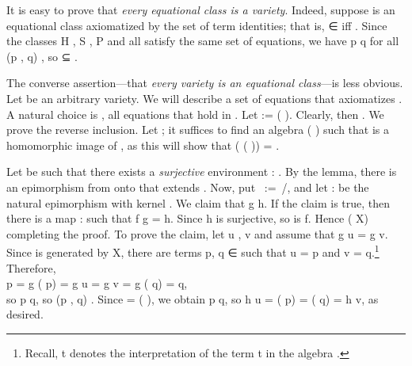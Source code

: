 It is easy to prove that \emph{every equational class is a variety}.  Indeed, suppose  is an equational
class axiomatized by the set  of term identities; that is,  ∈  iff
  . Since the classes \af H , \af S , \af P  and
 all satisfy the same set of equations, we have    \ab p
 \ab q for all (\ab p , \ab q)  , so   ⊆ .

The converse assertion---that \emph{every variety is an equational class}---is less obvious.
Let  be an arbitrary variety.  We will describe a set of equations that axiomatizes
.  A natural choice is  , all equations that hold in .
Let  :=  ( ). Clearly, then   .  We prove the
reverse inclusion. Let   ; it suffices to find an algebra  
 ( ) such that  is a homomorphic image of , as this will
show that    ( ( )) = .

Let  be such that there exists a \emph{surjective} environment
 :   .
By the  lemma, there is an epimorphism  from  onto 
that extends .
Now, put ~:=~/, and let  :   
be the natural epimorphism with kernel . We claim that  \ab g 
 \ab h. If the claim is true, then there is a map  :   
such that \ab f  \ab g = \ab h. Since \ab h is surjective, so is \ab f. Hence 
  ( \ab X)   completing the proof.
To prove the claim, let \ab u , \ab v   and assume that \ab g \ab u =
\ab g \ab v. Since  is generated by \ab X, there are terms \ab p, \ab q ∈
 such that \ab u =  \ab p and v =  \ab
q.\footnote{Recall,  \ab t denotes the interpretation of the term
\ab t in the algebra .} Therefore,\\[-4pt]

 \ab p = \ab g ( \ab p) = \ab g \ab u = \ab g \ab v =
\ab g ( \ab q) =  \ab q,\\[8pt]
so   \ab p  \ab q, so (\ab p , \ab q)  
. Since    =
 ( ), we obtain   \ab p  \ab q, so \ab h
\ab u = ( \ab p)   = ( \ab q)
  = \ab h \ab v, as desired.

